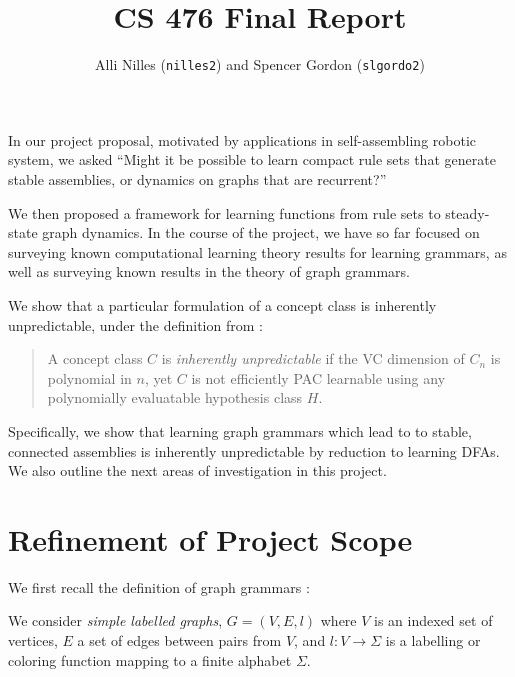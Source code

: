 \documentclass[]{article}
\title{CS 476 Final Report}
\author{Alli Nilles (\texttt{nilles2}) and Spencer Gordon (\texttt{slgordo2})}
\date{}
\begin{document}
\maketitle

\newcommand{\step}[1]{\xrightarrow{#1}}
\newcommand{\steps}[1]{\xRightarrow{#1}}









In our project proposal, motivated by applications in self-assembling
robotic system, we asked ``Might it be possible to learn compact rule
sets that generate stable assemblies, or dynamics on graphs that are
recurrent?''

We then proposed a framework for learning functions from rule sets to
steady-state graph dynamics. In the course of the project, we have so
far focused on surveying known computational learning theory results for
learning grammars, as well as surveying known results in the theory of
graph grammars.

We show that a particular formulation of a concept class is inherently
unpredictable, under the definition from \cite{kearns1994}:

\begin{quote}
A concept class \(C\) is \emph{inherently unpredictable} if the VC
dimension of \(C_n\) is polynomial in \(n\), yet \(C\) is not
efficiently PAC learnable using any polynomially evaluatable hypothesis
class \(H\).
\end{quote}

Specifically, we show that learning graph grammars which lead to to
stable, connected assemblies is inherently unpredictable by reduction to
learning DFAs. We also outline the next areas of investigation in this
project.

\section{Refinement of Project
Scope}\label{refinement-of-project-scope}

We first recall the definition of graph grammars \cite{litovsky}
\cite{klavins}:

We consider \emph{simple labelled graphs}, \(G = (V,E,l)\) where \(V\)
is an indexed set of vertices, \(E\) a set of edges between pairs from
\(V\), and \(l: V \to \Sigma\) is a labelling or coloring function mapping to a
finite alphabet $\Sigma$.
\end{document}
